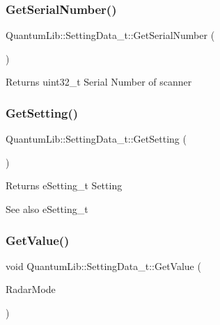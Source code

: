 \subsubsection{\texorpdfstring{Get\+Serial\+Number()}{GetSerialNumber()}}
{\footnotesize\ttfamily Quantum\+Lib\+::\+Setting\+Data\+\_\+t\+::\+Get\+Serial\+Number (\begin{DoxyParamCaption}{ }\end{DoxyParamCaption})\hspace{0.3cm}{\ttfamily [inline]}}

\begin{DoxyReturn}{Returns}
uint32\+\_\+t Serial Number of scanner 
\end{DoxyReturn}
\mbox{\label{struct_quantum_lib_1_1_setting_data__t_a35a86a3ade9011cba431902b12ead85a}} 
\subsubsection{\texorpdfstring{Get\+Setting()}{GetSetting()}}
{\footnotesize\ttfamily Quantum\+Lib\+::\+Setting\+Data\+\_\+t\+::\+Get\+Setting (\begin{DoxyParamCaption}{ }\end{DoxyParamCaption})\hspace{0.3cm}{\ttfamily [inline]}}

\begin{DoxyReturn}{Returns}
e\+Setting\+\_\+t Setting 
\end{DoxyReturn}
\begin{DoxySeeAlso}{See also}
e\+Setting\+\_\+t 
\end{DoxySeeAlso}
\mbox{\label{struct_quantum_lib_1_1_setting_data__t_ab53eb949027f8789ad32988ca2e7c6f4}} 
\subsubsection{\texorpdfstring{Get\+Value()}{GetValue()}\hspace{0.1cm}{\footnotesize\ttfamily [1/26]}}
{\footnotesize\ttfamily void Quantum\+Lib\+::\+Setting\+Data\+\_\+t\+::\+Get\+Value (\begin{DoxyParamCaption}\item[{\mbox{\hyperlink{namespace_quantum_lib_ade0390db62ad71cd1a56b97245d00619}{e\+Radar\+Mode\+\_\+t}} \&}]{Radar\+Mode }\end{DoxyParamCaption})\hspace{0.3cm}{\ttfamily [inline]}}



